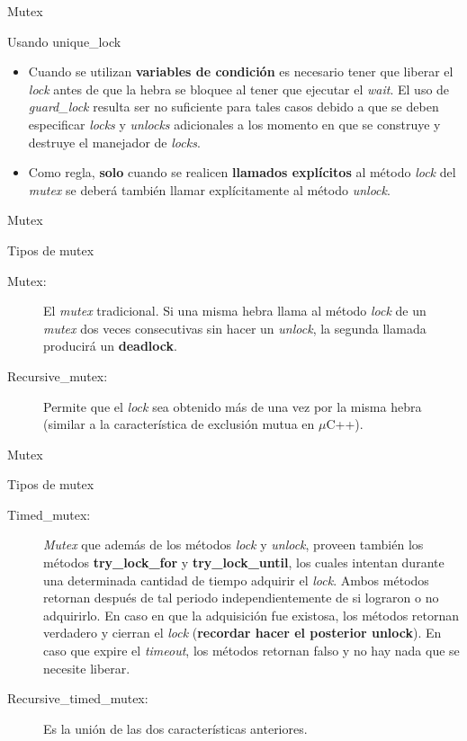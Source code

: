 \begin{frame}{Mutex}
\begin{block}{Usando unique\_lock}
\begin{itemize}
  \item Cuando se utilizan \textbf{variables de condición} es necesario tener que liberar el \textit{lock} antes de que la hebra se bloquee al tener que ejecutar el \textit{wait}. El uso de \textit{guard\_lock} resulta ser no suficiente para tales casos debido a que se deben especificar \textit{locks} y \textit{unlocks} adicionales a los momento en que se construye y destruye el manejador de \textit{locks}.
  \item Como regla, \textbf{solo} cuando se realicen \textbf{llamados explícitos} al método \textit{lock} del \textit{mutex} se deberá también llamar explícitamente al método \textit{unlock}.
\end{itemize}
\end{block}
\end{frame}

\begin{frame}{Mutex}
\begin{block}{Tipos de mutex}
\begin{description}
  \item[Mutex:] El \textit{mutex} tradicional. Si una misma hebra llama al método \textit{lock} de un \textit{mutex} dos veces consecutivas sin hacer un \textit{unlock}, la segunda llamada producirá un \textbf{deadlock}.
  \item[Recursive\_mutex:] Permite que el \textit{lock} sea obtenido más de una vez por la misma hebra (similar a la característica de exclusión mutua en $\mu$C++).
\end{description}
\end{block}
\end{frame}

\begin{frame}{Mutex}
\begin{block}{Tipos de mutex}
\begin{description}
  \item[Timed\_mutex:] \textit{Mutex} que además de los métodos \textit{lock} y \textit{unlock}, proveen también los métodos \textbf{try\_lock\_for} y \textbf{try\_lock\_until}, los cuales intentan durante una determinada cantidad de tiempo adquirir el \textit{lock}. Ambos métodos retornan después de tal periodo independientemente de si lograron o no adquirirlo. En caso en que la adquisición fue existosa, los métodos retornan verdadero y cierran el \textit{lock} (\textbf{recordar hacer el posterior unlock}). En caso que expire el \textit{timeout}, los métodos retornan falso y no hay nada que se necesite liberar.
  \item[Recursive\_timed\_mutex:] Es la unión de las dos características anteriores.
\end{description}
\end{block}
\end{frame}

